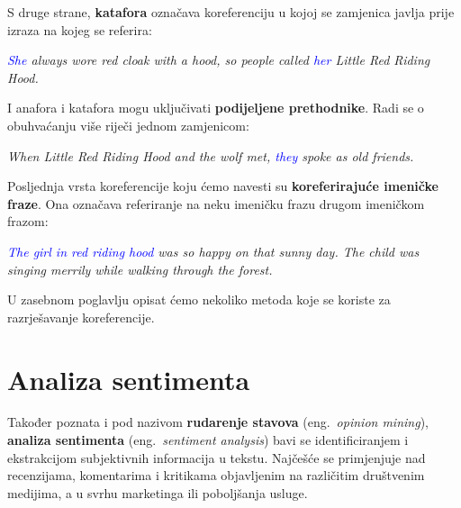 \documentclass[a4paper,twoside,12pt]{memoir} %
\newcommand{\ti}[1]{\textit{#1\/}}
\newcommand{\tb}{\textbf}
\begin{document}
	\smallskip

	S druge strane, \tb{katafora} označava koreferenciju u kojoj se zamjenica javlja prije izraza na kojeg se referira:
	\begin{displayquote}
		\ti{\textcolor{Blue}{She} always wore red cloak with a hood, so people called \textcolor{Blue}{her} \textcolor{BrickRed}{Little Red Riding Hood}.}
	\end{displayquote}

	\smallskip

	I anafora i katafora mogu uključivati \tb{podijeljene prethodnike}. Radi se o obuhvaćanju više riječi jednom zamjenicom:
	\begin{displayquote}
		\ti{When \textcolor{BrickRed}{Little Red Riding Hood} and \textcolor{BrickRed}{the wolf} met, \textcolor{Blue}{they} spoke as old friends.}
	\end{displayquote}

	\smallskip

	Posljednja vrsta koreferencije koju ćemo navesti su \tb{koreferirajuće imeničke fraze}. Ona označava referiranje na neku imeničku frazu drugom imeničkom frazom:
	\begin{displayquote}
		\ti{\textcolor{Blue}{The girl in red riding hood} was so happy on that sunny day. \textcolor{BrickRed}{The child} was singing merrily while walking through the forest.}
	\end{displayquote}

	\smallskip

	U zasebnom poglavlju opisat ćemo nekoliko metoda koje se koriste za razrješavanje koreferencije.


	\section{Analiza sentimenta}

	Također poznata i pod nazivom \tb{rudarenje stavova} (eng.~\ti{opinion mining}), \tb{analiza sentimenta} (eng.~\ti{sentiment analysis}) bavi se identificiranjem i ekstrakcijom subjektivnih informacija u tekstu. Najčešće se primjenjuje nad recenzijama, komentarima i kritikama objavljenim na različitim društvenim medijima, a u svrhu marketinga ili poboljšanja usluge.
\end{document}
